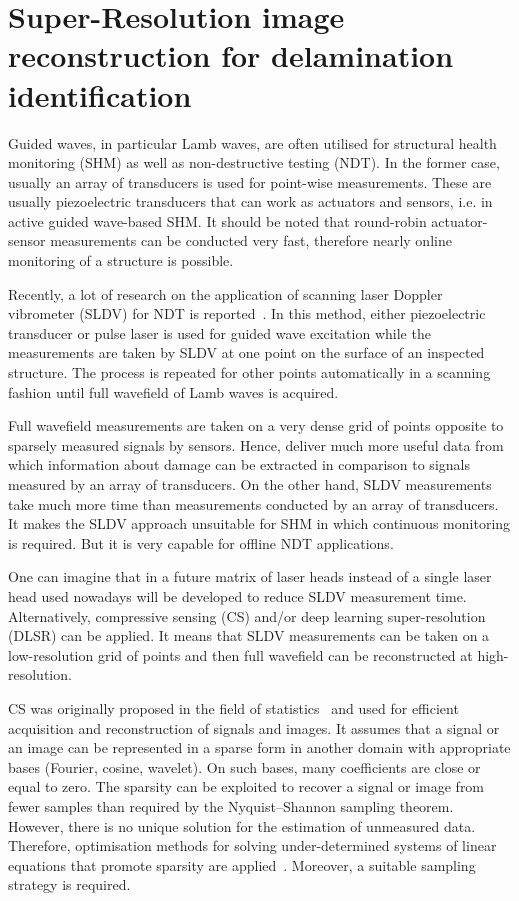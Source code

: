 \section{Super-Resolution image reconstruction for delamination identification}
\label{sec45}
Guided waves, in particular Lamb waves, are often utilised for structural health monitoring (SHM) as well as non-destructive testing (NDT).
In the former case, usually an array of transducers is used for point-wise measurements.
These are usually piezoelectric transducers that can work as actuators and sensors, i.e. in active guided wave-based SHM.
It should be noted that round-robin actuator-sensor measurements can be conducted very fast, therefore nearly online monitoring of a structure is possible.

Recently, a lot of research on the application of scanning laser Doppler vibrometer (SLDV) for NDT is reported~\cite{Flynn2013,Kudela2015,Kudela2018d,Segers2021,Segers2022}. 
In this method, either piezoelectric transducer or pulse laser is used for guided wave excitation while the measurements are taken by SLDV at one point on the surface of an inspected structure.
The process is repeated for other points automatically in a scanning fashion until full wavefield of Lamb waves is acquired.

Full wavefield measurements are taken on a very dense grid of points opposite to sparsely measured signals by sensors.
Hence, deliver much more useful data from which information about damage can be extracted in comparison to signals measured by an array of transducers.
On the other hand, SLDV measurements take much more time than measurements conducted by an array of transducers.
It makes the SLDV approach unsuitable for SHM in which continuous monitoring is required.
But it is very capable for offline NDT applications.

One can imagine that in a future matrix of laser heads instead of a single laser head used nowadays will be developed to reduce SLDV measurement time.
Alternatively, compressive sensing (CS) and/or deep learning super-resolution (DLSR) can be applied.
It means that SLDV measurements can be taken on a low-resolution grid of points and then full wavefield can be reconstructed at high-resolution.

CS was originally proposed in the field of statistics~\cite{Candes2006,Donoho2006} and used for efficient acquisition and reconstruction of signals and images.
It assumes that a signal or an image can be represented in a sparse form in another domain with appropriate bases (Fourier, cosine, wavelet).
On such bases, many coefficients are close or equal to zero.
The sparsity can be exploited to recover a signal or image from fewer samples than required by the Nyquist–Shannon sampling theorem.
However, there is no unique solution for the estimation of unmeasured data.
Therefore, optimisation methods for solving under-determined systems of linear equations that promote sparsity are applied~\cite{Chen1998,VanEwoutBerg2008,VandenBerg2019}.
Moreover, a suitable sampling strategy is required.

